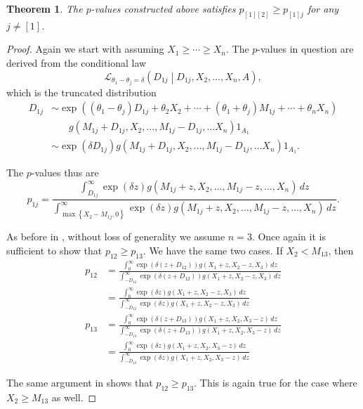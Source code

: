 \documentclass[11pt]{article}
\newtheorem{theorem}[corollary]{Theorem}
\begin{document}
\begin{theorem}
The $p$-values constructed above satisfies $p_{[1][2]} \ge p_{[1]j}$ for any $j \ne [1]$.
\end{theorem}

\begin{proof}
Again we start with assuming $X_1 \ge \cdots \ge X_n$. The $p$-values in question are derived from the conditional law
$$\mathcal{L}_{\theta_1 - \theta_j = \delta} \left(D_{1j} \middle| D_{1j}, X_2, \ldots, X_n, A\right),$$
which is the truncated distribution
\begin{align*}
D_{1j} & \sim \exp\left(\left(\theta_1 - \theta_j\right) D_{1j} + \theta_2 X_2 + \cdots + \left(\theta_1 + \theta_j\right) M_{1j} + \cdots + \theta_n X_n \right) \\
& ~~~~~~~~ g\left(M_{1j} + D_{1j}, X_2, \ldots, M_{1j} - D_{1j}, \ldots X_n\right) 1_{A_1} \\
& \sim \exp\left(\delta D_{1j}\right) g\left(M_{1j} + D_{1j}, X_2, \ldots, M_{1j} - D_{1j}, \ldots X_n\right) 1_{A_1}.
\end{align*}

The $p$-values thus are
$$p_{1j} = \frac{\int_{D_{1j}}^\infty \exp\left(\delta z\right) g\left(M_{1j} + z, X_2, \ldots, M_{1j} - z, \ldots, X_n\right) \,dz}{\int_{\max\left\{X_2 - M_{1j}, 0\right\}}^\infty \exp\left(\delta z\right) g\left(M_{1j} + z, X_2, \ldots, M_{1j} - z, \ldots, X_n\right) \,dz}.$$

As before in , without loss of generality we assume $n = 3$. Once again it is sufficient to show that $p_{12} \ge p_{13}$. We have the same two cases. If $X_2 < M_{13}$, then
\begin{align*}
p_{12} & = \frac{\int_0^\infty \exp\left(\delta \left(z + D_{12}\right)\right) g\left(X_1 + z, X_2 - z, X_3\right) \,dz}{\int_{-D_{12}}^\infty \exp\left(\delta \left(z + D_{12}\right)\right) g\left(X_1 + z, X_2 - z, X_3\right) \,dz} \\
& = \frac{\int_0^\infty \exp\left(\delta z\right) g\left(X_1 + z, X_2 - z, X_3\right) \,dz}{\int_{-D_{12}}^\infty \exp\left(\delta z\right) g\left(X_1 + z, X_2 - z, X_3\right) \,dz} \\
p_{13} & = \frac{\int_0^\infty \exp\left(\delta \left(z + D_{13}\right)\right) g\left(X_1 + z, X_2, X_3 - z\right) \,dz}{\int_{-D_{13}}^\infty \exp\left(\delta \left(z + D_{13}\right)\right) g\left(X_1 + z, X_2, X_3 - z\right) \,dz} \\
& = \frac{\int_0^\infty \exp\left(\delta z\right) g\left(X_1 + z, X_2, X_3 - z\right) \,dz}{\int_{-D_{13}}^\infty \exp\left(\delta z\right) g\left(X_1 + z, X_2, X_3 - z\right) \,dz}
\end{align*}

The same argument in  shows that $p_{12} \ge p_{13}$. This is again true for the case where $X_2 \ge M_{13}$ as well.
\end{proof}
\end{document}
